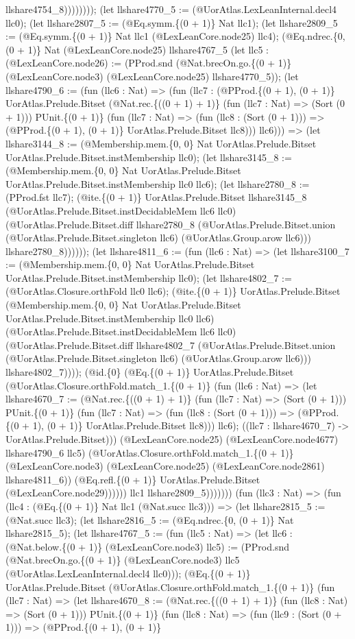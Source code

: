 \documentclass[11pt]{article}
\begin{document}
llshare4754\_8)))))))); (let llshare4770\_5 := (@UorAtlas.LexLeanInternal.decl4 llc0); (let llshare2807\_5 := (@Eq.symm.\{(0 + 1)\} Nat llc1); (let llshare2809\_5 := (@Eq.symm.\{(0 + 1)\} Nat llc1 (@LexLeanCore.node25) llc4); (@Eq.ndrec.\{0, (0 + 1)\} Nat (@LexLeanCore.node25) llshare4767\_5 (let llc5 : (@LexLeanCore.node26) := (PProd.snd (@Nat.brecOn.go.\{(0 + 1)\} (@LexLeanCore.node3) (@LexLeanCore.node25) llshare4770\_5)); (let llshare4790\_6 := (fun (llc6 : Nat) => (fun (llc7 : (@PProd.\{(0 + 1), (0 + 1)\} UorAtlas.Prelude.Bitset (@Nat.rec.\{((0 + 1) + 1)\} (fun (llc7 : Nat) => (Sort (0 + 1))) PUnit.\{(0 + 1)\} (fun (llc7 : Nat) => (fun (llc8 : (Sort (0 + 1))) => (@PProd.\{(0 + 1), (0 + 1)\} UorAtlas.Prelude.Bitset llc8))) llc6))) => (let llshare3144\_8 := (@Membership.mem.\{0, 0\} Nat UorAtlas.Prelude.Bitset UorAtlas.Prelude.Bitset.instMembership llc0); (let llshare3145\_8 := (@Membership.mem.\{0, 0\} Nat UorAtlas.Prelude.Bitset UorAtlas.Prelude.Bitset.instMembership llc0 llc6); (let llshare2780\_8 := (PProd.fst llc7); (@ite.\{(0 + 1)\} UorAtlas.Prelude.Bitset llshare3145\_8 (@UorAtlas.Prelude.Bitset.instDecidableMem llc6 llc0) (@UorAtlas.Prelude.Bitset.diff llshare2780\_8 (@UorAtlas.Prelude.Bitset.union (@UorAtlas.Prelude.Bitset.singleton llc6) (@UorAtlas.Group.arow llc6))) llshare2780\_8)))))); (let llshare4811\_6 := (fun (llc6 : Nat) => (let llshare3100\_7 := (@Membership.mem.\{0, 0\} Nat UorAtlas.Prelude.Bitset UorAtlas.Prelude.Bitset.instMembership llc0); (let llshare4802\_7 := (@UorAtlas.Closure.orthFold llc0 llc6); (@ite.\{(0 + 1)\} UorAtlas.Prelude.Bitset (@Membership.mem.\{0, 0\} Nat UorAtlas.Prelude.Bitset UorAtlas.Prelude.Bitset.instMembership llc0 llc6) (@UorAtlas.Prelude.Bitset.instDecidableMem llc6 llc0) (@UorAtlas.Prelude.Bitset.diff llshare4802\_7 (@UorAtlas.Prelude.Bitset.union (@UorAtlas.Prelude.Bitset.singleton llc6) (@UorAtlas.Group.arow llc6))) llshare4802\_7)))); (@id.\{0\} (@Eq.\{(0 + 1)\} UorAtlas.Prelude.Bitset (@UorAtlas.Closure.orthFold.match\_1.\{(0 + 1)\} (fun (llc6 : Nat) => (let llshare4670\_7 := (@Nat.rec.\{((0 + 1) + 1)\} (fun (llc7 : Nat) => (Sort (0 + 1))) PUnit.\{(0 + 1)\} (fun (llc7 : Nat) => (fun (llc8 : (Sort (0 + 1))) => (@PProd.\{(0 + 1), (0 + 1)\} UorAtlas.Prelude.Bitset llc8))) llc6); ((llc7 : llshare4670\_7) -> UorAtlas.Prelude.Bitset))) (@LexLeanCore.node25) (@LexLeanCore.node4677) llshare4790\_6 llc5) (@UorAtlas.Closure.orthFold.match\_1.\{(0 + 1)\} (@LexLeanCore.node3) (@LexLeanCore.node25) (@LexLeanCore.node2861) llshare4811\_6)) (@Eq.refl.\{(0 + 1)\} UorAtlas.Prelude.Bitset (@LexLeanCore.node29)))))) llc1 llshare2809\_5))))))) (fun (llc3 : Nat) => (fun (llc4 : (@Eq.\{(0 + 1)\} Nat llc1 (@Nat.succ llc3))) => (let llshare2815\_5 := (@Nat.succ llc3); (let llshare2816\_5 := (@Eq.ndrec.\{0, (0 + 1)\} Nat llshare2815\_5); (let llshare4767\_5 := (fun (llc5 : Nat) => (let llc6 : (@Nat.below.\{(0 + 1)\} (@LexLeanCore.node3) llc5) := (PProd.snd (@Nat.brecOn.go.\{(0 + 1)\} (@LexLeanCore.node3) llc5 (@UorAtlas.LexLeanInternal.decl4 llc0))); (@Eq.\{(0 + 1)\} UorAtlas.Prelude.Bitset (@UorAtlas.Closure.orthFold.match\_1.\{(0 + 1)\} (fun (llc7 : Nat) => (let llshare4670\_8 := (@Nat.rec.\{((0 + 1) + 1)\} (fun (llc8 : Nat) => (Sort (0 + 1))) PUnit.\{(0 + 1)\} (fun (llc8 : Nat) => (fun (llc9 : (Sort (0 + 1))) => (@PProd.\{(0 + 1), (0 + 1)\} 
\end{document}
